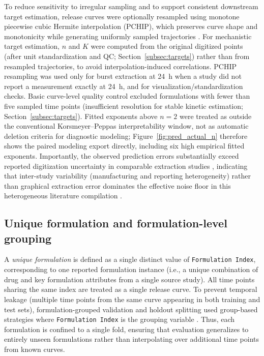 \documentclass[preprint,12pt,authoryear]{elsarticle}
\begin{document}
To reduce sensitivity to irregular sampling and to support consistent downstream target estimation, release curves were optionally resampled using monotone piecewise cubic Hermite interpolation (PCHIP), which preserves curve shape and monotonicity while generating uniformly sampled trajectories \citep{FritschCarlson1980, Virtanen2020SciPy}. For mechanistic target estimation, $n$ and $K$ were computed from the original digitized points (after unit standardization and QC; Section~\ref{subsec:targets}) rather than from resampled trajectories, to avoid interpolation-induced correlations. PCHIP resampling was used only for burst extraction at 24~h when a study did not report a measurement exactly at 24~h, and for visualization/standardization checks. Basic curve-level quality control excluded formulations with fewer than five sampled time points (insufficient resolution for stable kinetic estimation; Section~\ref{subsec:targets}). Fitted exponents above $n=2$ were treated as outside the conventional Korsmeyer--Peppas interpretability window, not as automatic deletion criteria for diagnostic modeling; Figure~\ref{fig:pred_actual_n} therefore shows the paired modeling export directly, including six high empirical fitted exponents. Importantly, the observed prediction errors substantially exceed reported digitization uncertainty in comparable extraction studies \citep{Drevon2017WPD}, indicating that inter-study variability (manufacturing and reporting heterogeneity) rather than graphical extraction error dominates the effective noise floor in this heterogeneous literature compilation \citep{Fredenberg2011, FreibergZhu2004}.

\subsection{Unique formulation and formulation-level grouping}
\label{subsec:formulation_index}
A \textit{unique formulation} is defined as a single distinct value of \texttt{Formulation Index}, corresponding to one reported formulation instance (i.e., a unique combination of drug and key formulation attributes from a single source study). All time points sharing the same index are treated as a single release curve. To prevent temporal leakage (multiple time points from the same curve appearing in both training and test sets), formulation-grouped validation and holdout splitting used group-based strategies where \texttt{Formulation Index} is the grouping variable \citep{Roberts2017CVStructure}. Thus, each formulation is confined to a single fold, ensuring that evaluation generalizes to entirely unseen formulations rather than interpolating over additional time points from known curves.
\end{document}
